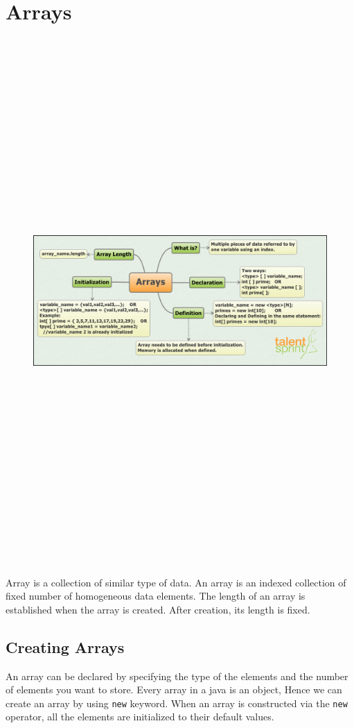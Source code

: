 \documentclass[11pt,a4paper]{article}
\begin{document}
\section*{Arrays}
\begin{figure}[H]
 \begin{center}
   \includegraphics[angle=90,height=20cm, width=13cm]{Arrays.png}
  
 \end{center}
 \end{figure}
Array is a collection of similar type of data. An array is an indexed collection of fixed number of homogeneous data elements. The length of an array is established when the array is created. After creation, its length is fixed.

\subsection*{Creating Arrays} 
An array can be declared by specifying the type of the elements and the number of elements you want to store. Every array in a java is an object, Hence we can create an array by using \lstinline!new! keyword. When an array is constructed via the \lstinline!new! operator, all the elements are initialized to their default values.
\end{document}

